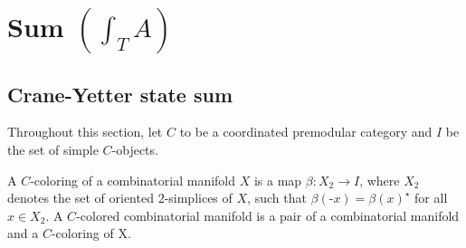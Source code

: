 \section{Sum $\left( \int_{T}{A} \right)$}\label{section/sum}
\subsection{Crane-Yetter state sum}

\noindent Throughout this section, let $C$ to be a coordinated
premodular category and $I$ be the set of simple $C$-objects.



\begin{definition}
  A $C$-coloring of a combinatorial manifold $X$ is a map
  $\beta: X_{2} \to I$, where $X_{2}$ denotes the set of oriented
  $2$-simplices of $X$, such that
  $\beta(\text{-}x) = \beta(x)^{\star}$ for all $x \in X_{2}$. A
  $C$-colored combinatorial manifold is a pair of a combinatorial
  manifold and a $C$-coloring of X.
\end{definition}

